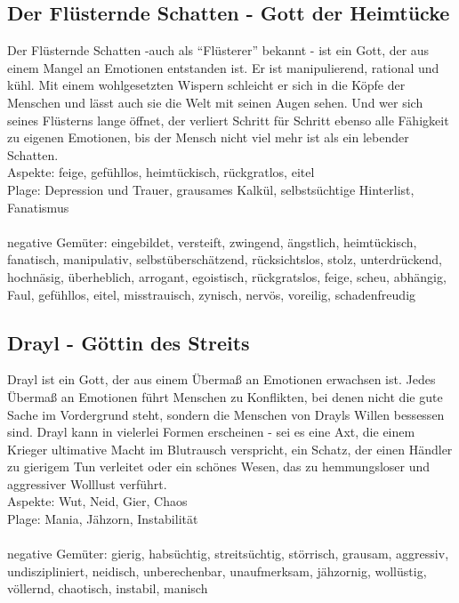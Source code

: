 \subsection{\textbf{Der Flüsternde Schatten} - Gott der Heimtücke}
Der Flüsternde Schatten -auch als ``Flüsterer'' bekannt - ist ein Gott, der aus einem Mangel an Emotionen entstanden ist. Er ist manipulierend, rational und kühl. Mit einem 
wohlgesetzten Wispern schleicht er sich in die Köpfe der Menschen und lässt auch sie die Welt mit seinen Augen sehen. Und wer sich seines Flüsterns lange öffnet, der verliert 
Schritt für Schritt ebenso alle Fähigkeit zu eigenen Emotionen, bis der Mensch nicht viel mehr ist als ein lebender Schatten.\\
Aspekte: feige, gefühllos, heimtückisch, rückgratlos, eitel\\
Plage: Depression und Trauer, grausames Kalkül, selbstsüchtige Hinterlist, Fanatismus\\~\\

negative Gemüter: eingebildet, versteift, zwingend, ängstlich, heimtückisch, fanatisch, manipulativ, selbstüberschätzend, rücksichtslos, stolz, unterdrückend, hochnäsig,
überheblich, arrogant, egoistisch, rückgratslos, feige, scheu, abhängig, Faul, gefühllos, eitel, misstrauisch, zynisch, nervös, voreilig, schadenfreudig

\subsection{\textbf{Drayl} - Göttin des Streits}
Drayl ist ein Gott, der aus einem Übermaß an Emotionen erwachsen ist. Jedes Übermaß an Emotionen führt Menschen zu Konflikten, bei denen nicht die gute Sache im Vordergrund 
steht, sondern die Menschen von Drayls Willen bessessen sind. Drayl kann in vielerlei Formen erscheinen - sei es eine Axt, die einem Krieger ultimative Macht im Blutrausch 
verspricht, ein Schatz, der einen Händler zu gierigem Tun verleitet oder ein schönes Wesen, das zu hemmungsloser und aggressiver Wolllust verführt.\\
Aspekte: Wut, Neid, Gier, Chaos\\
Plage: Mania, Jähzorn, Instabilität\\~\\

negative Gemüter: gierig,  habsüchtig,  streitsüchtig, störrisch, grausam, aggressiv, undiszipliniert, neidisch, unberechenbar, unaufmerksam, jähzornig, wollüstig, völlernd, 
chaotisch, instabil, manisch


